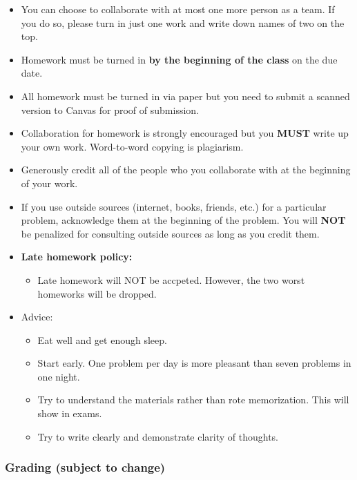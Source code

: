 \documentclass[
]{article}
\providecommand{\tightlist}{%
  \setlength{\itemsep}{0pt}\setlength{\parskip}{0pt}}
\begin{document}
\begin{itemize}
\tightlist
\item
  You can choose to collaborate with at most one more person as a team. If you do so,
  please turn in just one work and write down names of two on the top.
\item
  Homework must be turned in \textbf{by the beginning of the class} on the due date.
\item
  All homework must be turned in via paper but you need to submit a scanned version to Canvas for proof of submission.
\item
  Collaboration for homework is strongly encouraged but you \textbf{MUST} write up your own work. Word-to-word copying is plagiarism.
\item
  Generously credit all of the people who you collaborate with at the beginning of your work.
\item
  If you use outside sources (internet, books, friends, etc.) for a particular problem, acknowledge them at the beginning of the problem.
  You will \textbf{NOT} be penalized for consulting outside sources as long as you credit them.
\item
  \textbf{Late homework policy:}

  \begin{itemize}
  \tightlist
  \item
    Late homework will NOT be accpeted. However, the two worst homeworks will be dropped.
  \end{itemize}
\item
  Advice:

  \begin{itemize}
  \tightlist
  \item
    Eat well and get enough sleep.
  \item
    Start early. One problem per day is more pleasant than seven problems in one night.
  \item
    Try to understand the materials rather than rote memorization. This will show in exams.
  \item
    Try to write clearly and demonstrate clarity of thoughts.
  \end{itemize}
\end{itemize}

\hypertarget{grading-subject-to-change}{%
\subsubsection*{Grading (subject to change)}\label{grading-subject-to-change}}
\end{document}
